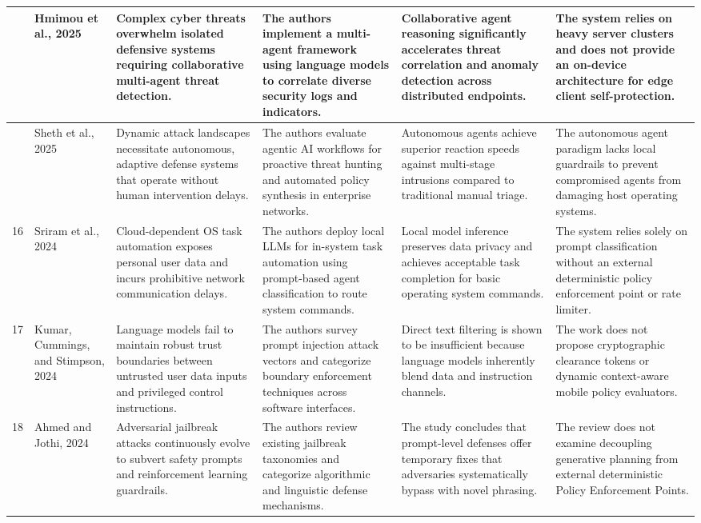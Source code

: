 \begin{center}
\begin{longtable}{|>{\centering\arraybackslash}p{0.55cm}|p{2.0cm}|p{2.7cm}|p{2.8cm}|p{2.7cm}|p{2.7cm}|}
14 & Hmimou et al., 2025 \cite{hmimou2025multi} & Complex cyber threats overwhelm isolated defensive systems requiring collaborative multi-agent threat detection. & The authors implement a multi-agent framework using language models to correlate diverse security logs and indicators. & Collaborative agent reasoning significantly accelerates threat correlation and anomaly detection across distributed endpoints. & The system relies on heavy server clusters and does not provide an on-device architecture for edge client self-protection. \\
\hline

15 & Sheth et al., 2025 \cite{sheth2025agentic} & Dynamic attack landscapes necessitate autonomous, adaptive defense systems that operate without human intervention delays. & The authors evaluate agentic AI workflows for proactive threat hunting and automated policy synthesis in enterprise networks. & Autonomous agents achieve superior reaction speeds against multi-stage intrusions compared to traditional manual triage. & The autonomous agent paradigm lacks local guardrails to prevent compromised agents from damaging host operating systems. \\
\hline

16 & Sriram et al., 2024 \cite{sriram2024leveraging} & Cloud-dependent OS task automation exposes personal user data and incurs prohibitive network communication delays. & The authors deploy local LLMs for in-system task automation using prompt-based agent classification to route system commands. & Local model inference preserves data privacy and achieves acceptable task completion for basic operating system commands. & The system relies solely on prompt classification without an external deterministic policy enforcement point or rate limiter. \\
\hline

17 & Kumar, Cummings, and Stimpson, 2024 \cite{kumar2024strengthening} & Language models fail to maintain robust trust boundaries between untrusted user data inputs and privileged control instructions. & The authors survey prompt injection attack vectors and categorize boundary enforcement techniques across software interfaces. & Direct text filtering is shown to be insufficient because language models inherently blend data and instruction channels. & The work does not propose cryptographic clearance tokens or dynamic context-aware mobile policy evaluators. \\
\hline

18 & Ahmed and Jothi, 2024 \cite{ahmed2024jailbreak} & Adversarial jailbreak attacks continuously evolve to subvert safety prompts and reinforcement learning guardrails. & The authors review existing jailbreak taxonomies and categorize algorithmic and linguistic defense mechanisms. & The study concludes that prompt-level defenses offer temporary fixes that adversaries systematically bypass with novel phrasing. & The review does not examine decoupling generative planning from external deterministic Policy Enforcement Points. \\
\hline


\end{longtable}
\end{center}

